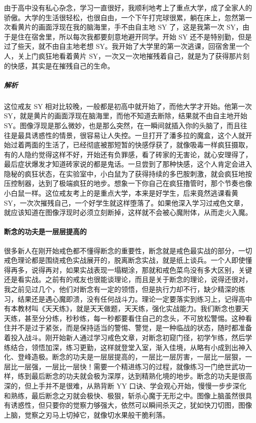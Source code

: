 \begin{case}
    由于高中没有私心杂念，学习一直很好，我顺利地考上了重点大学，成了全家人的骄傲。大学的生活很轻松，也很自由，一个下午打完球很累，躺在床上，忽然第一次看黄片的画面浮现在我的脑海里，手不由自主地 SY 了，这是我第一次 SY，由于是住在宿舍里，所以每次我都要刻意地避开同学。开始 SY 还不是特别勤，但是过了些天，就不由自主地老想 SY。我开始了大学里的第一次逃课，回宿舍里一个人，关上门疯狂地看着黄片 SY，一次又一次地摧残着自己，就是为了获得那片刻的快感，其实是在摧残自己的生命。
    \subparagraph{解析} 这位戒友 SY 相对比较晚，一般都是初高中就开始了，而他大学才开始。他第一次 SY，就是黄片的画面浮现在脑海里，而他不知道去断除，结果就不由自主地开始 SY。图像浮现是那么微妙，也是那么突然，在一瞬间就插入你的头脑了，而且往往是最具诱惑性的情景，很容易让人失控。一旦打开了潘多拉的魔盒，这个人就开始过着两面的生活了，已经彻底被那短暂的快感俘获了，就像吸毒一样疯狂摄取，有的人隐约觉得这样不好，开始还有负罪感，看了砖家的无害论，就心安理得了，最后症状爆发才知道砖家说的都是鬼话。一旦尝到了那种快感，这个人肯定会进入隐秘的疯狂状态，在实验室中，小白鼠为了获得持续的多巴胺刺激，就会疯狂地按压控制器，达到了极端疯狂的地步。想象一下你自己在疯狂撸管时，那个节奏也像小白鼠一样。这位戒友考上的是重点大学，本来是好学生，后来竟然逃课看黄 SY，一次次摧残自己，一个好学生就这样堕落了。如果他深入学习过戒色文章，就应该知道在图像浮现时必须立刻断掉，这样就不会被心魔附体，从而走火入魔。
\end{case}

\paragraph{断念的功夫是一层层提高的}

很多新人在刚开始戒色都不懂得断念的重要性，断念就是戒色最实战的部分，一切戒色理论都是围绕戒色实战展开的，脱离断念实战，就是纸上谈兵。一个人即使懂得再多，说得再对，如果实战表现一塌糊涂，那就和戒色菜鸟没有多大区别，关键还是看实战。之前有的戒友也很能谈理论，而且是关于断念的理论，说得还很对，我之前见过几个，他们对断念有一定的领悟，但是执行力却不行，缺少精深的练习，结果还是遇心魔即溃，没有任何战斗力。理论一定要落实到练习上，记得高中有本教材叫《天天练》，就是天天做题，天天练，强化实战能力。我们断念也要天天练，甚至分分练，秒秒练，每一秒都要看住自己的念头，不可放松警惕。这种看住并不是过于紧张，而是保持适当的警惕、警觉，是一种临战的状态，随时都准备着投入战斗。刚开始新人通过学习戒色文章，对断念初窥门径，初学乍练，然后学练结合，领悟加深，练习更勤，这样就登堂入室，渐入佳境，从略有小成到出神入化、登峰造极。断念的功夫是一层层提高的，一层比一层厉害，一层比一层狠，一层比一层强，一层比一层快！需要一个精进练习的过程，就像练习一门绝世武功一样，练到最后断念的功夫就会极为深厚，达到精熟化境的地步。断念的功夫是很高深的，但上手并不是很难，从熟背断 YY 口诀、学会观心开始，慢慢一步步深化和熟练，最后断念之刃就会极快、极狠，斩杀心魔于无形之中。图像上脑虽然很具有诱惑性，但只要你的觉察力够强大，依然可以瞬间杀灭之，犹如快刀切图，图像上脑，觉察之刃马上切掉它，就像切水果般干脆利落。

